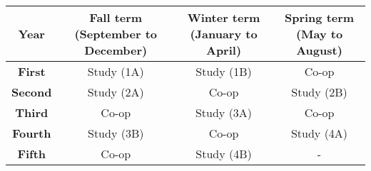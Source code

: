 \documentclass[a4paper,12pt]{article}
\begin{document}
\begin{table}[h!]
    \centering
    \begin{tabular}{|c|c|c|c|}
        \hline
        \textbf{Year} & \textbf{Fall term (September to December)} & \textbf{Winter term (January to April)} & \textbf{Spring term (May to August)} \\
        \hline
        \textbf{First} & Study (1A) & Study (1B) & Co-op \\
        \hline
        \textbf{Second} & Study (2A) & Co-op & Study (2B) \\
        \hline
        \textbf{Third} & Co-op & Study (3A) & Co-op \\
        \hline
        \textbf{Fourth} & Study (3B) & Co-op & Study (4A) \\
        \hline
        \textbf{Fifth} & Co-op & Study (4B) & - \\
        \hline
    \end{tabular}
    
\end{table}
\end{document}
